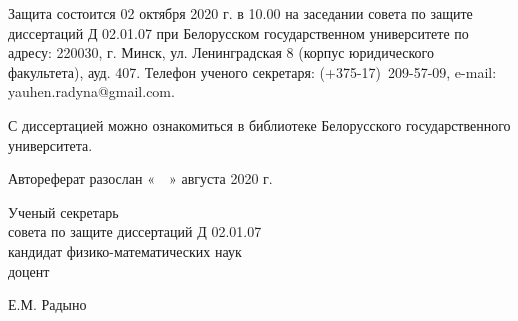 \documentclass[_00_autoref.tex]{subfiles}
\begin{document}

{

Защита состоится 02 октября 2020 г. в 10.00 на заседании совета
по защите диссертаций Д 02.01.07 при Белорусском государственном университете
по адресу: 220030, г. Минск, ул. Ленинградская 8 (корпус юридического факультета),
ауд. 407. Телефон ученого секретаря: (+375-17)~209-57-09, e-mail: yauhen.radyna@gmail.com. 

С диссертацией можно ознакомиться в библиотеке
Белорусского государственного университета.
}


\noindent Автореферат разослан «$\quad$» августа 2020 г.\\

\noindent
\begin{minipage}[b]{0.6\textwidth}
\begin{flushleft}
Ученый секретарь \\
совета по защите диссертаций Д 02.01.07 \\
кандидат физико-математических наук \\
доцент
\end{flushleft}
\end{minipage}
\begin{minipage}[b]{0.39\textwidth}
\begin{flushright}
Е.М. Радыно 
\end{flushright}
\end{minipage}
\eject

\pagestyle{plain}
\setcounter{page}{1}
\setlength{\voffset}{-8mm}
\end{document}
